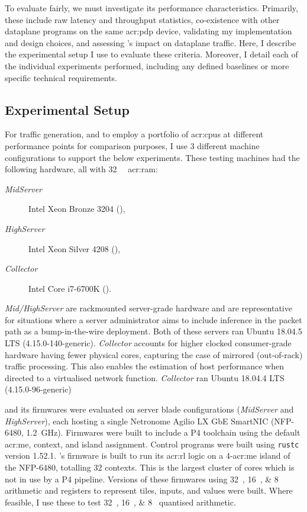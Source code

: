 To evaluate \approachshort{} fairly, we must investigate its performance characteristics.
Primarily, these include raw latency and throughput statistics, co-existence with other dataplane programs on the same \gls{acr:pdp} device, validating my implementation and design choices, and assessing \approachshort{}'s impact on dataplane traffic.
Here, I describe the experimental setup I use to evaluate these criteria.
Moreover, I detail each of the individual experiments performed, including any defined baselines or more specific technical requirements.

\subsection{Experimental Setup}\label{sec:experimental-setup}
For traffic generation, and to employ a portfolio of \glspl{acr:cpu} at different performance points for comparison purposes, I use 3 different machine configurations to support the below experiments.
These testing machines had the following hardware, all with \qty{32}{\gibi\byte} \gls{acr:ram}:
\begin{description}
	\item[\emph{MidServer}] Intel Xeon Bronze 3204 (),
	\item[\emph{HighServer}] Intel Xeon Silver 4208 (),
	\item[\emph{Collector}] Intel Core i7-6700K ().
\end{description}
\emph{Mid/HighServer} are rackmounted server-grade hardware and are representative for situations where a server administrator aims to include inference in the packet path as a bump-in-the-wire deployment.
Both of these servers ran Ubuntu 18.04.5 LTS (4.15.0-140-generic).
\emph{Collector} accounts for higher clocked consumer-grade hardware having fewer physical cores, capturing the case of mirrored (out-of-rack) traffic processing.
This also enables the estimation of host performance when directed to a virtualised network function.
\emph{Collector} ran Ubuntu 18.04.4 LTS (4.15.0-96-generic)

\approachshort{} and its firmwares were evaluated on server blade configurations (\emph{MidServer} and \emph{HighServer}), each hosting a single Netronome Agilio LX GbE SmartNIC (NFP-6480, \qty{1.2}{\giga\hertz}).
Firmwares were built to include a P4 toolchain using the default \gls{acr:me}, context, and island assignment.
Control programs were built using \texttt{rustc} version 1.52.1.
\approachshort{}'s firmware is built to run its \gls{acr:rl} logic on a \num{4}-\gls{acr:me} island of the NFP-6480, totalling \num{32} contexts.
This is the largest cluster of cores which is not in use by a P4 pipeline.
Versions of these firmwares using \qtylist{32;16;8}{\bit} arithmetic and registers to represent tiles, inputs, and values were built.
Where feasible, I use these to test \qtylist{32;16;8}{\bit} quantised arithmetic.


